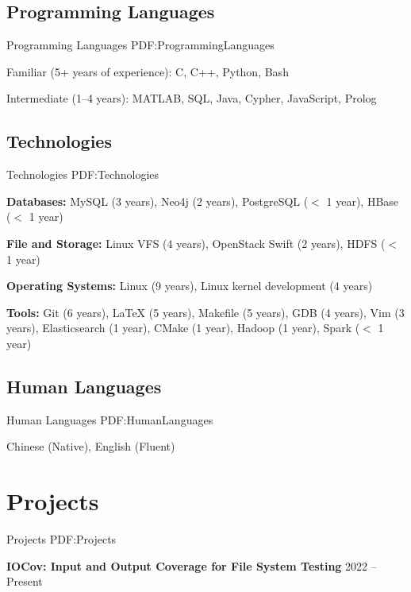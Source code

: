 \documentclass[letterpaper,10pt,oneside]{article}
\begin{document}
\begin{body}
\subsection
{Programming Languages}
{Programming Languages}
{PDF:ProgrammingLanguages}

\BulletItem
Familiar (5+ years of experience): C, C++, Python, Bash

\GapNoBreak

\BulletItem
Intermediate (1--4 years): MATLAB, SQL, Java, Cypher, JavaScript, Prolog



\subsection
{Technologies}
{Technologies}
{PDF:Technologies}

\BulletItem
\textbf{Databases:} MySQL (3 years), Neo4j (2 years), PostgreSQL ($<$ 1 year), HBase ($<$ 1 year)

\GapNoBreak

\BulletItem
\textbf{File and Storage:} Linux VFS (4 years), OpenStack Swift (2 years), HDFS ($<$ 1 year)

\GapNoBreak

\BulletItem
\textbf{Operating Systems:} Linux (9 years), Linux kernel development (4 years)

\GapNoBreak

\BulletItem
\textbf{Tools:} Git (6 years), {\LaTeX} (5 years), Makefile (5 years), GDB (4 years), Vim (3 years), Elasticsearch (1 year), CMake (1 year), Hadoop (1 year), Spark ($<$ 1 year)

\subsection
{Human Languages}
{Human Languages}
{PDF:HumanLanguages}

\BulletItem
Chinese (Native), English (Fluent)
\GapNoBreak

\section
{Projects}
{Projects}
{PDF:Projects}

\textbf{IOCov: Input and Output Coverage for File System Testing}
\hfill
2022 -- 
Present


\end{body}
\end{document}
